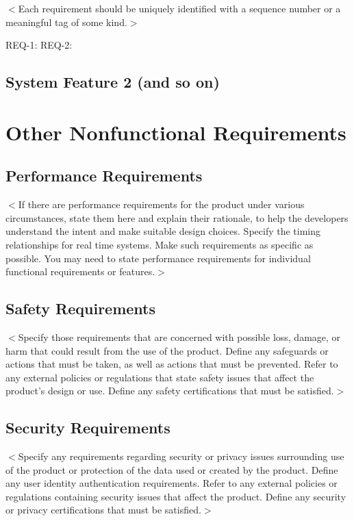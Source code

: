\documentclass[a4paper, 11pt]{scrreprt}
\begin{document}
$<$Each requirement should be uniquely identified with a sequence number or a 
meaningful tag of some kind.$>$

REQ-1:	REQ-2:

\section{System Feature 2 (and so on)}


\chapter{Other Nonfunctional Requirements}

\section{Performance Requirements}
$<$If there are performance requirements for the product under various 
circumstances, state them here and explain their rationale, to help the 
developers understand the intent and make suitable design choices. Specify the 
timing relationships for real time systems. Make such requirements as specific 
as possible. You may need to state performance requirements for individual 
functional requirements or features.$>$

\section{Safety Requirements}
$<$Specify those requirements that are concerned with possible loss, damage, or 
harm that could result from the use of the product. Define any safeguards or 
actions that must be taken, as well as actions that must be prevented. Refer to 
any external policies or regulations that state safety issues that affect the 
product's design or use. Define any safety certifications that must be 
satisfied.$>$

\section{Security Requirements}
$<$Specify any requirements regarding security or privacy issues surrounding use 
of the product or protection of the data used or created by the product. Define 
any user identity authentication requirements. Refer to any external policies or 
regulations containing security issues that affect the product. Define any 
security or privacy certifications that must be satisfied.$>$
\end{document}
